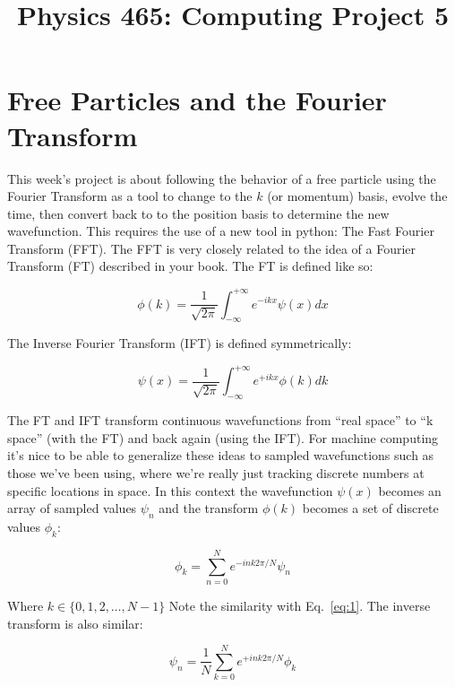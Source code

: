 \documentclass[11pt]{article} %
\title{Physics 465: Computing Project 5}
\begin{document}
\maketitle

\section*{Free Particles and the Fourier Transform}

This week's project is about following the behavior of a free particle using the Fourier Transform as a tool to change to the $k$ (or momentum) basis, evolve the time, then convert back to to the position basis to determine the new wavefunction. This requires the use of a new tool in python: The Fast Fourier Transform (FFT). The FFT is very closely related to the idea of a Fourier Transform (FT) described in your book. The FT is defined like so:

\begin{equation}
\phi(k) = \frac{1}{\sqrt{2\pi}} \int_{-\infty}^{+\infty} e^{-i k x} \psi(x) dx
\label{eq:1}
\end{equation}

The Inverse Fourier Transform (IFT) is defined symmetrically:

\begin{equation}
\psi(x) = \frac{1}{\sqrt{2\pi}} \int_{-\infty}^{+\infty} e^{+i k x} \phi(k) dk
\label{eq:2}
\end{equation}

The FT and IFT transform continuous wavefunctions from ``real space'' to ``k space'' (with the FT) and back again (using the IFT). For machine computing it's nice to be able to generalize these ideas to sampled wavefunctions such as those we've been using, where we're really just tracking discrete numbers at specific locations in space. In this context the wavefunction $\psi(x)$ becomes an array of sampled values $\psi_n$ and the transform $\phi(k)$ becomes a set of discrete values $\phi_k$:

\begin{equation}
\phi_k = \sum_{n=0}^N e^{-i n k 2 \pi/N} \psi_n
\end{equation}

Where $k \in \{0, 1, 2, \ldots, N-1\}$ Note the similarity with Eq.~\ref{eq:1}. The inverse transform is also similar:

\begin{equation}
\psi_n = \frac{1}{N}\sum_{k=0}^N e^{+i n k 2 \pi/N} \phi_k
\end{equation}
\end{document}
